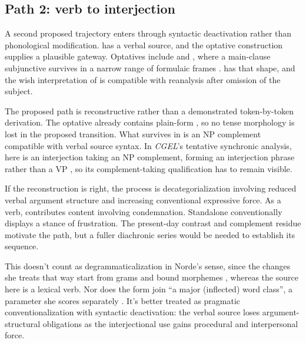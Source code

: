 \documentclass[12pt]{article}
\begin{document}
\subsection{Path 2: verb to interjection}

A second proposed trajectory enters through syntactic deactivation rather
than phonological modification.  has a verbal source, and the
optative construction supplies a plausible gateway. Optatives include
 and , where a main-clause
subjunctive survives in a narrow range of formulaic frames
\citep[944]{HuddlestonPullum2002}.  has that shape, and
the wish interpretation of  is compatible with reanalysis
after omission of the subject.

The proposed path is reconstructive rather than a demonstrated token-by-token
derivation. The optative already contains plain-form , so no
tense morphology is lost in the proposed transition. What survives in
 is an NP complement compatible with verbal
source syntax. In \textit{CGEL}'s tentative synchronic analysis,
 here is an interjection taking an NP complement, forming an
interjection phrase rather than a VP \citep[1361 n.~70]{HuddlestonPullum2002},
so its complement-taking qualification has to remain visible.

If the reconstruction is right, the process is decategorialization involving
reduced verbal argument structure and increasing conventional expressive
force. As a verb,  contributes content involving condemnation.
Standalone  conventionally displays a stance of frustration.
The present-day contrast and complement residue motivate the path, but a
fuller diachronic series would be needed to establish its sequence.

This doesn't count as degrammaticalization in Norde's sense, since the
changes she treats that way start from grams and bound morphemes
\citep[cf.][186]{norde2009}, whereas the source here is a lexical verb. Nor
does the form join \enquote{a major (inflected) word class}, a parameter she
scores separately \citep[192]{norde2009}. It's better treated as pragmatic
conventionalization with syntactic deactivation: the verbal source
loses argument-structural obligations as the interjectional use gains
procedural and interpersonal force.
\end{document}

